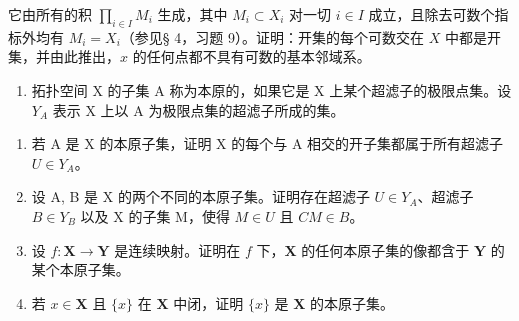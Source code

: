 它由所有的积 \(\prod_{i\in I}M_i\) 生成，其中 \(M_i\subset X_i\) 对一切 \(i\in I\) 成立，且除去可数个指标外均有 \(M_i = X_i\)（参见§ 4，习题 9）。证明：开集的每个可数交在 \(X\) 中都是开集，并由此推出，\(x\) 的任何点都不具有可数的基本邻域系。

\begin{enumerate}
\def\labelenumi{\arabic{enumi})}
\setcounter{enumi}{6}
\tightlist
\item
  拓扑空间 X 的子集 A 称为本原的，如果它是 X 上某个超滤子的极限点集。设 \(Y_{A}\) 表示 X 上以 A 为极限点集的超滤子所成的集。
\end{enumerate}

\begin{enumerate}
\def\labelenumi{\alph{enumi})}
\item
  若 A 是 X 的本原子集，证明 X 的每个与 A 相交的开子集都属于所有超滤子 \(U \in Y_{A}\)。
\item
  设 A, B 是 X 的两个不同的本原子集。证明存在超滤子 \(U \in Y_{A}\)、超滤子 \(B \in Y_{B}\) 以及 X 的子集 M，使得 \(M \in U\) 且 \(CM \in B\)。
\item
  设 \(f: \mathbf{X} \to \mathbf{Y}\) 是连续映射。证明在 \(f\) 下，\(\mathbf{X}\) 的任何本原子集的像都含于 \(\mathbf{Y}\) 的某个本原子集。
\item
  若 \(x \in \mathbf{X}\) 且 \(\{x\}\) 在 \(\mathbf{X}\) 中闭，证明 \(\{x\}\) 是 \(\mathbf{X}\) 的本原子集。
\end{enumerate}

